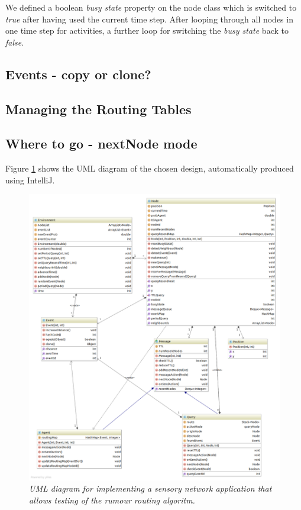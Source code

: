 \documentclass[a4paper,11pt,twoside]{article}
\begin{document}
We defined a boolean \textit{busy state} property on the node class
which is switched to \textit{true} after having used the current time
step. After looping through all nodes in one time step for activities,
a further loop for switching the \textit{busy state} back to
\textit{false}.

\subsection{Events - copy or clone?}
\subsection{Managing the Routing Tables}
\subsection{Where to go - nextNode mode}




Figure \ref{fig:uml} shows the UML diagram of the chosen design,
automatically produced using IntelliJ.
\begin{figure}
\centering
\includegraphics[width=\textwidth]{uml.png}
\caption{\textit{UML diagram for implementing a sensory network application
  that allows testing of the rumour routing algoritm.}}
\label{fig:uml}
\end{figure}
\end{document}
